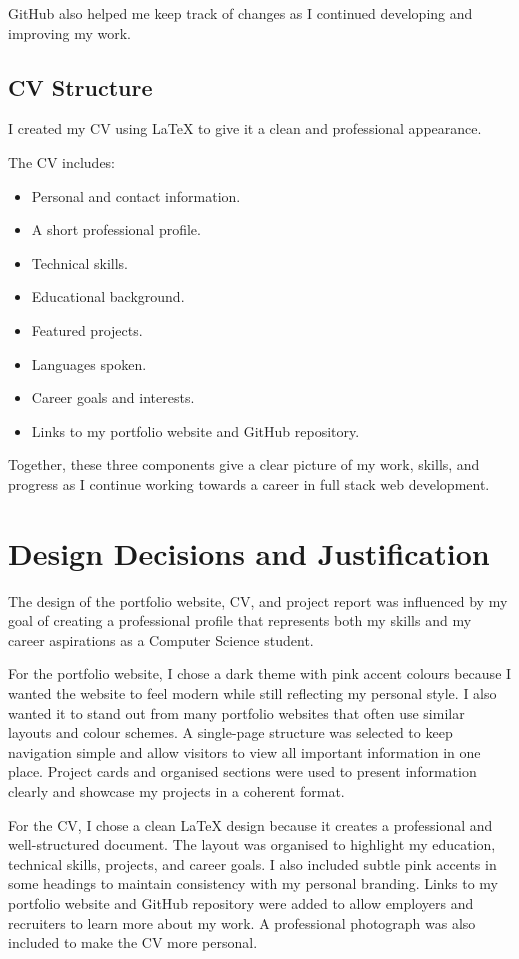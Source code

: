 \documentclass[12pt,a4paper]{article}
\begin{document}
GitHub also helped me keep track of changes as I continued developing and improving my work.

\subsection{CV Structure}

I created my CV using LaTeX to give it a clean and professional appearance.

The CV includes:

\begin{itemize}
\item Personal and contact information.
\item A short professional profile.
\item Technical skills.
\item Educational background.
\item Featured projects.
\item Languages spoken.
\item Career goals and interests.
\item Links to my portfolio website and GitHub repository.
\end{itemize}

Together, these three components give a clear picture of my work, skills, and progress as I continue working towards a career in full stack web development.


\section{Design Decisions and Justification}

The design of the portfolio website, CV, and project report was influenced by my goal of creating a professional profile that represents both my skills and my career aspirations as a Computer Science student.

For the portfolio website, I chose a dark theme with pink accent colours because I wanted the website to feel modern while still reflecting my personal style. I also wanted it to stand out from many portfolio websites that often use similar layouts and colour schemes. A single-page structure was selected to keep navigation simple and allow visitors to view all important information in one place. Project cards and organised sections were used to present information clearly and showcase my projects in a coherent format.

For the CV, I chose a clean LaTeX design because it creates a professional and well-structured document. The layout was organised to highlight my education, technical skills, projects, and career goals. I also included subtle pink accents in some headings to maintain consistency with my personal branding. Links to my portfolio website and GitHub repository were added to allow employers and recruiters to learn more about my work. A professional photograph was also included to make the CV more personal.
\end{document}
